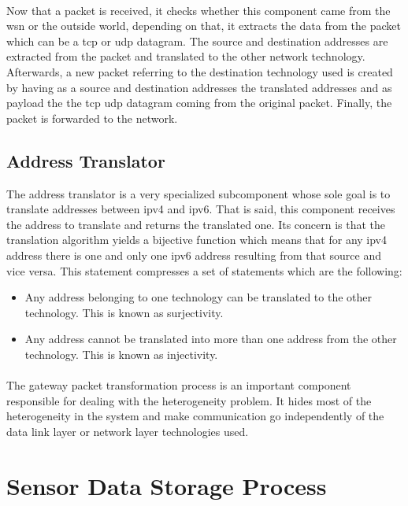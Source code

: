 \documentclass[oneside,12pt,a4paper,final]{book}
\begin{document}
\paragraph{}
Now that a packet is received, it checks whether this component came from the \gls{wsn} or the outside world, depending on that, it extracts the data from the packet which can be a \gls{tcp} or \gls{udp} datagram. The source and destination addresses are extracted from the packet and translated to the other network technology. Afterwards, a new packet referring to the destination technology used is created by having as a source and destination addresses the translated addresses and as payload the the \gls{tcp} \gls{udp} datagram coming from the original packet. Finally, the packet is forwarded to the network.
\subsection{Address Translator}
The address translator is a very specialized subcomponent whose sole goal is to translate addresses between \gls{ipv4} and \gls{ipv6}. That is said, this component receives the address to translate and returns the translated one. Its concern is that the translation algorithm yields a bijective function which means that for any \gls{ipv4} address there is one and only one \gls{ipv6} address resulting from that source and vice versa. This statement compresses a set of statements which are the following:

\begin{itemize}
\item Any address belonging to one technology can be translated to the other technology. This is known as surjectivity.
\item Any address cannot be translated into more than one address from the other technology. This is known as injectivity.
\end{itemize}
\paragraph{}
The gateway packet transformation process is an important component responsible for dealing with the heterogeneity problem. It hides most of the heterogeneity in the system and make communication go independently of the data link layer or network layer technologies used.

\section{Sensor Data Storage Process}
\end{document}
